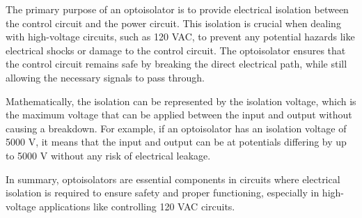 The primary purpose of an optoisolator is to provide electrical isolation between the control circuit and the power circuit. This isolation is crucial when dealing with high-voltage circuits, such as 120 VAC, to prevent any potential hazards like electrical shocks or damage to the control circuit. The optoisolator ensures that the control circuit remains safe by breaking the direct electrical path, while still allowing the necessary signals to pass through.

Mathematically, the isolation can be represented by the isolation voltage, which is the maximum voltage that can be applied between the input and output without causing a breakdown. For example, if an optoisolator has an isolation voltage of 5000 V, it means that the input and output can be at potentials differing by up to 5000 V without any risk of electrical leakage.

In summary, optoisolators are essential components in circuits where electrical isolation is required to ensure safety and proper functioning, especially in high-voltage applications like controlling 120 VAC circuits.

